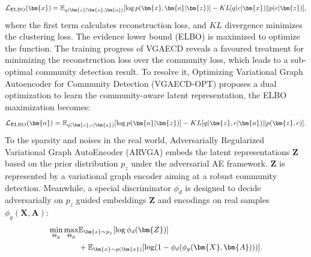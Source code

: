 \begin{equation}
\small
\mathcal{L}_{\mathrm{ELBO}}(\bm{x}) = \mathbb{E}_{q(\bm{z} | \bm{x}, \bm{a})}[\log p(\bm{x},\bm{a} | \bm{z})] - KL[q(c | \bm{x}) \| p(c | \bm{z})],
\end{equation}
where the first term calculates reconstruction loss, and $KL$ divergence minimizes the clustering loss. The evidence lower bound (ELBO) is maximized to optimize the function. 
The training progress of VGAECD reveals a favoured treatment for minimizing the reconstruction loss over the community loss, which leads to a sub-optimal community detection result. To resolve it, Optimizing Variational Graph Autoencoder for Community Detection (VGAECD-OPT)  proposes a dual optimization to learn the community-aware latent representation, the ELBO maximization becomes:
\begin{equation}
\small
\mathcal{L}_{\mathrm{ELBO}}(\bm{a}) = \mathbb{E}_{q(\bm{z}, c | \bm{a})}[\log p(\bm{a} | \bm{z})] - KL[q(\bm{z}, c | \bm{a}) \| p(\bm{z}, c)].
\end{equation}
To the sparsity and noises in the real world, Adversarially Regularized Variational Graph AutoEncoder (ARVGA)  embeds the latent representations $\bm{Z}$ based on the prior distribution $p_{z}$ under the adversarial AE framework. $\bm{Z}$ is represented by a variational graph encoder aiming at a robust community detection. Meanwhile, a special discriminator $\phi_d$ is designed to decide adversarially on $p_{z}$ guided embeddings $\bm{Z}$ and encodings on real samples $\phi_g(\bm{X}, \bm{A})$:
\begin{equation}
\small
\begin{aligned}
\min_{\Theta_g}\max_{\Theta_d} & \mathbb{E}_{\bm{z} \sim p_{z}}[\log \phi_d(\bm{Z})]\\
& +\mathbb{E}_{\bm{x} \sim p(\bm{x})}[\log (1-\phi_d(\phi_g(\bm{X}, \bm{A})))].
\end{aligned} 
\end{equation}

